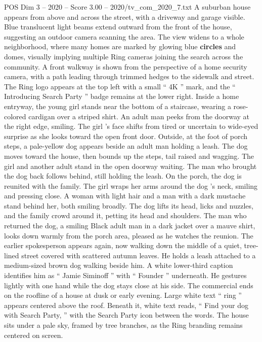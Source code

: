 \begin{textsample}{POS Dim 3 – 2020 – Score 3.00 – 2020/tv\_com\_2020\_7.txt}
A suburban house appears from above and across the street, with a driveway and garage visible.
Blue translucent light beams extend outward from the front of the house, suggesting an outdoor camera scanning the area.
The view widens to a whole neighborhood, where many homes are marked by glowing blue \textbf{circles} and domes, visually implying multiple Ring cameras joining the search across the community.
A front walkway is shown from the perspective of a home security camera, with a path leading through trimmed hedges to the sidewalk and street.
The Ring logo appears at the top left with a small “ 4K ” mark, and the “ Introducing Search Party ” badge remains at the lower right.
Inside a home entryway, the young girl stands near the bottom of a staircase, wearing a rose-colored cardigan over a striped shirt.
An adult man peeks from the doorway at the right edge, smiling.
The girl ’s face shifts from tired or uncertain to wide-eyed surprise as she looks toward the open front door.
Outside, at the foot of porch steps, a pale-yellow dog appears beside an adult man holding a leash.
The dog moves toward the house, then bounds up the steps, tail raised and wagging.
The girl and another adult stand in the open doorway waiting.
The man who brought the dog back follows behind, still holding the leash.
On the porch, the dog is reunited with the family.
The girl wraps her arms around the dog ’s neck, smiling and pressing close.
A woman with light hair and a man with a dark mustache stand behind her, both smiling broadly.
The dog lifts its head, licks and nuzzles, and the family crowd around it, petting its head and shoulders.
The man who returned the dog, a smiling Black adult man in a dark jacket over a mauve shirt, looks down warmly from the porch area, pleased as he watches the reunion.
The earlier spokesperson appears again, now walking down the middle of a quiet, tree-lined street covered with scattered autumn leaves.
He holds a leash attached to a medium-sized brown dog walking beside him.
A white lower-third caption identifies him as “ Jamie Siminoff ” with “ Founder ” underneath.
He gestures lightly with one hand while the dog stays close at his side.
The commercial ends on the roofline of a house at dusk or early evening.
Large white text “ ring ” appears centered above the roof.
Beneath it, white text reads, “ Find your dog with Search Party, ” with the Search Party icon between the words.
The house sits under a pale sky, framed by tree branches, as the Ring branding remains centered on screen.

\end{textsample}
